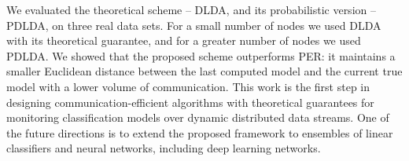 \documentclass{vldb}
\begin{document}
We evaluated the theoretical scheme -- DLDA,  and its probabilistic version -- PDLDA, on three real data sets.
For a small number of nodes we used DLDA with its theoretical guarantee, and for a greater number of nodes we used
PDLDA. We showed that the proposed scheme outperforms PER: it maintains a smaller Euclidean distance between
the last computed model and the current true model with a lower volume of communication.
This work is the first step in designing communication-efficient algorithms
with theoretical guarantees for monitoring classification models over dynamic distributed data streams. One of the future directions is to extend the proposed framework to
ensembles of linear classifiers and neural networks, including deep learning networks.


\nocite{*}
\end{document}
